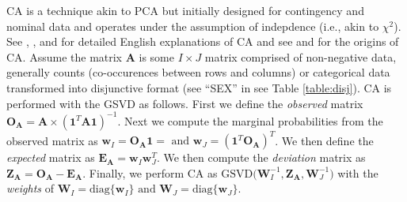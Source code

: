 \documentclass[12pt]{article}
\begin{document}
CA is a technique akin to PCA but initially designed for contingency and
nominal data and operates under the assumption of indepdence (i.e., akin
to \(\chi^2\)). See \citet{greenacre_theory_1984},
\citet{greenacre_correspondence_2010-1}, and
\citet{lebart_multivariate_1984} for detailed English explanations of CA
and see \citet{escofier-cordier_analyse_1965} and
\citet{benzecri_analyse_1973} for the origins of CA. Assume the matrix
\({\mathbf A}\) is some \(I \times J\) matrix comprised of non-negative
data, generally counts (co-occurences between rows and columns) or
categorical data transformed into disjunctive format (see ``SEX'' in see
Table \ref{table:disj}). CA is performed with the GSVD as follows. First
we define the \emph{observed} matrix
\({\mathbf O}_{\mathbf A} = {\mathbf A} \times ({\mathbf 1}^{T}{\mathbf A} {\mathbf 1})^{-1}\).
Next we compute the marginal probabilities from the observed matrix as
\({\mathbf w}_{I} = {\mathbf O}_{\mathbf A}{\mathbf 1} = \text{ and } {\mathbf w}_{J} = ({\mathbf 1}^{T}{\mathbf O}_{\mathbf A})^{T}\).
We then define the \emph{expected} matrix as
\({\mathbf E}_{\mathbf A} = {\mathbf w}_{I}{\mathbf w}_{J}^{T}\). We
then compute the \emph{deviation} matrix as
\({\mathbf Z}_{\mathbf A} = {\mathbf O}_{\mathbf A} - {\mathbf E}_{\mathbf A}\).
Finally, we perform CA as
\(\mathrm{GSVD(} {\mathbf W}_{I}^{-1}, {\mathbf Z}_{\mathbf A}, {\mathbf W}_{J}^{-1} \mathrm{)}\)
with the \emph{weights} of
\({\mathbf W}_{I} = \mathrm{diag\{} {\mathbf w}_{I} \mathrm{\}} \text{ and } {\mathbf W}_{J} = \mathrm{diag\{} {\mathbf w}_{J} \mathrm{\}}\).
\end{document}
